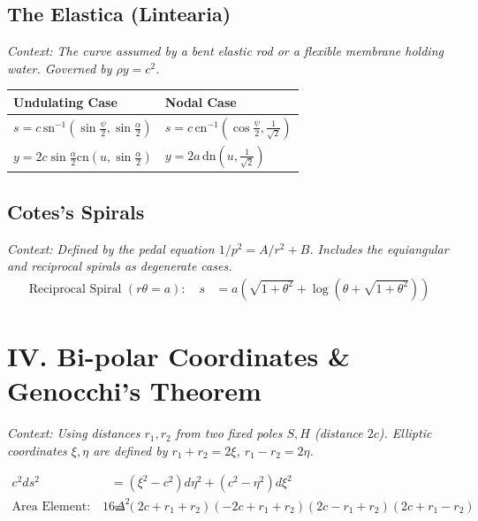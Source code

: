 \documentclass[11pt, a4paper]{article}
\begin{document}
\subsection*{\color{secondary} The Elastica (Lintearia)}
\textit{\small Context: The curve assumed by a bent elastic rod or a flexible membrane holding water. Governed by $\rho y = c^2$.}
\begin{center}
\begin{tabular}{@{}p{} p{}@{}}
\toprule
\textbf{Undulating Case} & \textbf{Nodal Case} \\
\midrule
$s = c \, \text{sn}^{-1}\left(\sin\frac{\psi}{2}, \sin\frac{\alpha}{2}\right)$ & $s = c \, \text{cn}^{-1}\left(\cos\frac{\psi}{2}, \frac{1}{\sqrt{2}}\right)$ \\
$y = 2c \sin\frac{\alpha}{2} \text{cn}\left(u, \sin\frac{\alpha}{2}\right)$ & $y = 2a \, \text{dn}\left(u, \frac{1}{\sqrt{2}}\right)$ \\
\bottomrule
\end{tabular}
\end{center}

\subsection*{\color{secondary} Cotes's Spirals}
\textit{\small Context: Defined by the pedal equation $1/p^2 = A/r^2 + B$. Includes the equiangular and reciprocal spirals as degenerate cases.}
\begin{align*}
    \text{Reciprocal Spiral } (r\theta = a): \quad s &= a \left( \sqrt{1+\theta^2} + \log(\theta + \sqrt{1+\theta^2}) \right)
\end{align*}

\section*{\color{primary} IV. Bi-polar Coordinates \& Genocchi's Theorem}

\textit{\small Context: Using distances $r_1, r_2$ from two fixed poles $S, H$ (distance $2c$). Elliptic coordinates $\xi, \eta$ are defined by $r_1+r_2 = 2\xi$, $r_1-r_2 = 2\eta$.}

\begin{align*}
    c^2 ds^2 &= (\xi^2 - c^2) d\eta^2 + (c^2 - \eta^2) d\xi^2 \\
    \text{Area Element:} \quad 16\Delta^2 &= (2c+r_1+r_2)(-2c+r_1+r_2)(2c-r_1+r_2)(2c+r_1-r_2)
\end{align*}
\end{document}
